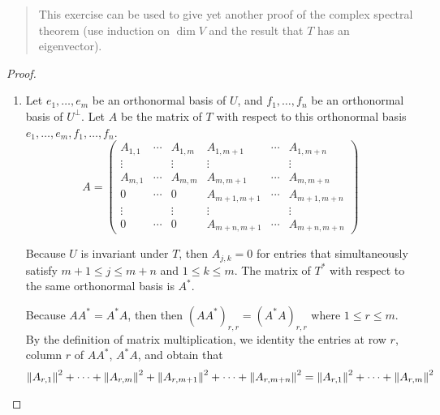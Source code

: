 \begin{quote}
    This exercise can be used to give yet another proof of the complex spectral theorem (use induction on $\dim V$ and the result that $T$ has an eigenvector).
\end{quote}

\begin{proof}
    \begin{enumerate}[label={(\alph*)}]
        \item Let $e_{1}, \ldots, e_{m}$ be an orthonormal basis of $U$, and $f_{1}, \ldots, f_{n}$ be an orthonormal basis of $U^{\bot}$. Let $A$ be the matrix of $T$ with respect to this orthonormal basis $e_{1}, \ldots, e_{m}, f_{1}, \ldots, f_{n}$.
              \[
                  A =
                  \begin{pmatrix}
                      A_{1,1} & \cdots & A_{1,m} & A_{1,m+1}   & \cdots & A_{1,m+n}   \\
                      \vdots  &        & \vdots  & \vdots      &        & \vdots      \\
                      A_{m,1} & \cdots & A_{m,m} & A_{m,m+1}   & \cdots & A_{m,m+n}   \\
                      0       & \cdots & 0       & A_{m+1,m+1} & \cdots & A_{m+1,m+n} \\
                      \vdots  &        & \vdots  & \vdots      &        & \vdots      \\
                      0       & \cdots & 0       & A_{m+n,m+1} & \cdots & A_{m+n,m+n}
                  \end{pmatrix}
              \]

              Because $U$ is invariant under $T$, then $A_{j,k} = 0$ for entries that simultaneously satisfy $m+1\leq j\leq m+n$ and $1\leq k\leq m$. The matrix of $T^{*}$ with respect to the same orthonormal basis is $A^{*}$.

              Because $AA^{*} = A^{*}A$, then then ${(AA^{*})}_{r,r} = {(A^{*}A)}_{r,r}$ where $1\leq r\leq m$. By the definition of matrix multiplication, we identity the entries at row $r$, column $r$ of $AA^{*}$, $A^{*}A$, and obtain that
              \[
                  \left\Vert{A_{r,1}}\right\Vert^{2} + \cdots + \left\Vert{A_{r,m}}\right\Vert^{2} + \left\Vert{A_{r,m+1}}\right\Vert^{2} + \cdots + \left\Vert{A_{r,m+n}}\right\Vert^{2} = \left\Vert{A_{r,1}}\right\Vert^{2} + \cdots + \left\Vert{A_{r,m}}\right\Vert^{2}
              \]


\end{enumerate}
\end{proof}
